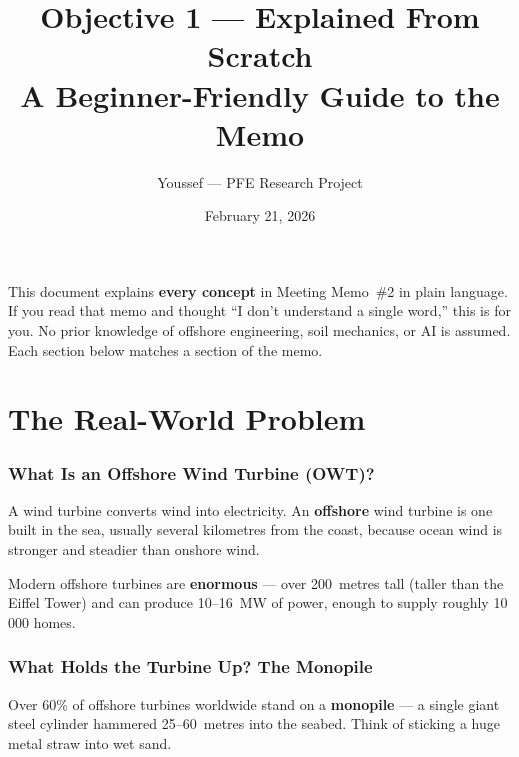 \documentclass[11pt,a4paper]{article}
\title{%
  \textbf{Objective 1 --- Explained From Scratch} \\[6pt]
  \large A Beginner-Friendly Guide to the Memo
}
\author{Youssef --- PFE Research Project}
\date{February 21, 2026}
\begin{document}
\maketitle

\begin{tcolorbox}[colback=green!5, colframe=green!50!black, title=What is this document?]
This document explains \textbf{every concept} in Meeting Memo~\#2 in plain
language.  If you read that memo and thought ``I don't understand a single
word,'' this is for you.  No prior knowledge of offshore engineering, soil
mechanics, or AI is assumed.  Each section below matches a section of the memo.
\end{tcolorbox}

\tableofcontents
\newpage

\part{The Real-World Problem}

\section{What Is an Offshore Wind Turbine (OWT)?}

A wind turbine converts wind into electricity.  An \textbf{offshore} wind
turbine is one built in the sea, usually several kilometres from the coast,
because ocean wind is stronger and steadier than onshore wind.

Modern offshore turbines are \textbf{enormous} --- over 200~metres tall
(taller than the Eiffel Tower) and can produce 10--16~MW of power, enough
to supply roughly 10\,000 homes.

\section{What Holds the Turbine Up?  The Monopile}

Over 60\% of offshore turbines worldwide stand on a \textbf{monopile} --- a
single giant steel cylinder hammered 25--60~metres into the seabed.  Think of
sticking a huge metal straw into wet sand.
\end{document}
